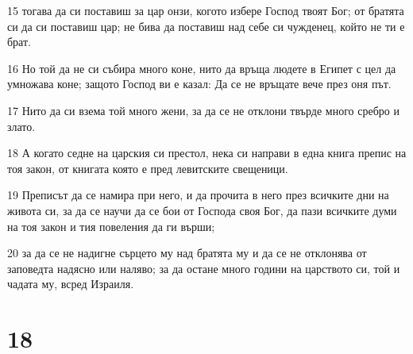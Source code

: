\par 15 тогава да си поставиш за цар онзи, когото избере Господ твоят Бог; от братята си да си поставиш цар; не бива да поставиш над себе си чужденец, който не ти е брат.
\par 16 Но той да не си събира много коне, нито да връща людете в Египет с цел да умножава коне; защото Господ ви е казал: Да се не връщате вече през оня път.
\par 17 Нито да си взема той много жени, за да се не отклони твърде много сребро и злато.
\par 18 А когато седне на царския си престол, нека си направи в една книга препис на тоя закон, от книгата която е пред левитските свещеници.
\par 19 Преписът да се намира при него, и да прочита в него през всичките дни на живота си, за да се научи да се бои от Господа своя Бог, да пази всичките думи на тоя закон и тия повеления да ги върши;
\par 20 за да се не надигне сърцето му над братята му и да се не отклонява от заповедта надясно или наляво; за да остане много години на царството си, той и чадата му, всред Израиля.

\chapter{18}

